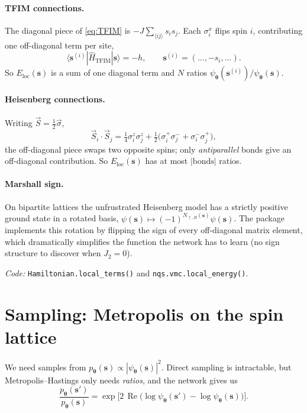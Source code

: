 \documentclass[11pt,a4paper]{article}
\newcommand{\bs}{\bm{s}}
\newcommand{\btheta}{\bm{\theta}}
\newcommand{\Hop}{\hat{H}}
\newcommand{\psip}{\psi_{\btheta}}
\newcommand{\Eloc}{E_{\mathrm{loc}}}
\DeclareMathOperator{\Real}{Re}
\theoremstyle{definition}
\theoremstyle{plain}
\begin{document}
\paragraph{TFIM connections.} The diagonal piece of \eqref{eq:TFIM} is
$-J \sum_{\langle ij\rangle} s_{i} s_{j}$. Each $\sigma^{x}_{i}$ flips spin
$i$, contributing one off-diagonal term per site,
\begin{equation}
   \langle \bs^{(i)} | \Hop_{\text{TFIM}} | \bs \rangle = -h,
   \qquad \bs^{(i)} = (\dots, -s_{i}, \dots).
\end{equation}
So $\Eloc(\bs)$ is a sum of one diagonal term and $N$ ratios
$\psip(\bs^{(i)})/\psip(\bs)$.

\paragraph{Heisenberg connections.} Writing $\vec S = \tfrac{1}{2}\vec\sigma$,
\begin{equation}
   \vec S_{i}\cdot \vec S_{j}
   = \tfrac{1}{4} \sigma^{z}_{i}\sigma^{z}_{j}
   + \tfrac{1}{2}\bigl(\sigma^{+}_{i}\sigma^{-}_{j} + \sigma^{-}_{i}\sigma^{+}_{j}\bigr),
\end{equation}
the off-diagonal piece swaps two opposite spins; only \emph{antiparallel}
bonds give an off-diagonal contribution. So $\Eloc(\bs)$ has at most
$|\text{bonds}|$ ratios.

\paragraph{Marshall sign.} On bipartite lattices the unfrustrated Heisenberg
model has a strictly positive ground state in a rotated basis,
$\psi(\bs) \mapsto (-1)^{N_{\uparrow,B}(\bs)}\psi(\bs)$. The package
implements this rotation by flipping the sign of every off-diagonal matrix
element, which dramatically simplifies the function the network has to
learn (no sign structure to discover when $J_{2}=0$).

\smallskip
\noindent\textit{Code:} \texttt{Hamiltonian.local\_terms()} and
\texttt{nqs.vmc.local\_energy()}.

\section{Sampling: Metropolis on the spin lattice}

We need samples from $p_{\btheta}(\bs) \propto |\psip(\bs)|^{2}$.
Direct sampling is intractable, but Metropolis--Hastings only needs
\emph{ratios}, and the network gives us
\begin{equation}
   \frac{p_{\btheta}(\bs')}{p_{\btheta}(\bs)}
   = \exp\!\bigl[2\,\Real\bigl(\log\psip(\bs') - \log\psip(\bs)\bigr)\bigr].
\end{equation}
\end{document}
